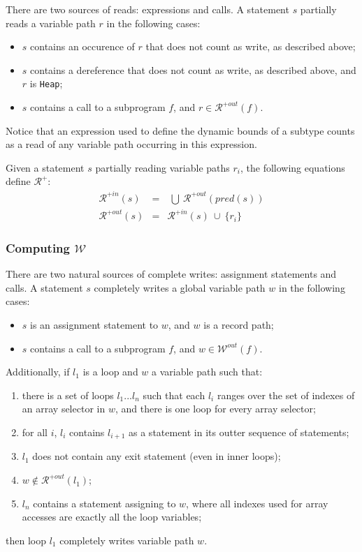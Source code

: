 \documentclass[fullpage]{article}
\newcommand{\code}[1]{\texttt{#1}}
\newcommand{\heap}{\code{Heap}\xspace}
\newcommand{\pred}[1]{\ensuremath{\mathit{pred}(#1)}\xspace}
\newcommand{\writes}{$\mathcal{W}$\xspace}
\newcommand{\outwrites}[1]{\ensuremath{\mathcal{W}^{out}(#1)}\xspace}
\newcommand{\allreads}{$\mathcal{R^+}$\xspace}
\newcommand{\inallreads}[1]{\ensuremath{\mathcal{R}^{+in}(#1)}\xspace}
\newcommand{\outallreads}[1]{\ensuremath{\mathcal{R}^{+out}(#1)}\xspace}
\newcommand{\union}{~\cup~}
\newcommand{\bigunion}{~\bigcup~}
\begin{document}
There are two sources of reads: expressions and calls. A statement $s$
partially reads a variable path $r$ in the following cases:
\begin{itemize}
\item $s$ contains an occurence of $r$ that does not count as write, as
  described above;
\item $s$ contains a dereference that does not count as write, as described
  above, and $r$ is \heap;
\item $s$ contains a call to a subprogram $f$, and $r \in \outallreads{f}$.
\end{itemize}

Notice that an expression used to define the dynamic bounds of a subtype counts
as a read of any variable path occurring in this expression.

Given a statement $s$ partially reading variable paths $r_i$, the following
equations define \allreads:
\begin{eqnarray*}
\inallreads{s} &=& \bigunion \outallreads{\pred{s}}\\
\outallreads{s} &=& \inallreads{s} \union \{r_i\}
\end{eqnarray*}

\subsubsection{Computing \writes}

There are two natural sources of complete writes: assignment statements and
calls. A statement $s$ completely writes a global variable path $w$ in the
following cases:
\begin{itemize}
\item $s$ is an assignment statement to $w$, and $w$ is a record path;
\item $s$ contains a call to a subprogram $f$, and $w \in \outwrites{f}$.
\end{itemize}
Additionally, if $l_1$ is a loop and $w$ a variable path such that:
\begin{enumerate}
\item there is a set of loops $l_1...l_n$ such that each $l_i$ ranges over the
  set of indexes of an array selector in $w$, and there is one loop for every
  array selector;
\item for all $i$, $l_i$ contains
  $l_{i+1}$ as a statement in its outter sequence of statements;
\item $l_1$ does not contain any exit statement (even in inner loops);
\item $w \notin \outallreads{l_1}$;
\item $l_n$ contains a statement assigning to $w$, where all indexes used for
  array accesses are exactly all the loop variables;
\end{enumerate}
then loop $l_1$ completely writes variable path $w$.
\end{document}
